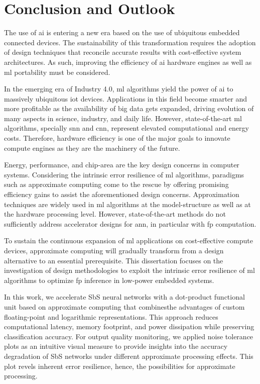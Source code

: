 \chapter{Conclusion and Outlook}
\label{chap.conclusion}
\minitoc
The use of \gls{ai} is entering a new era based on the use of ubiquitous embedded connected devices. The sustainability of this transformation requires the adoption of design techniques that reconcile accurate results with cost-effective system architectures. As such, improving the efficiency of \gls{ai} hardware engines as well as \gls{ml} portability must be considered.

In the emerging era of Industry 4.0, \gls{ml} algorithms yield the power of \gls{ai} to massively ubiquitous \gls{iot} devices. Applications in this field become smarter and more profitable as the availability of big data gets expanded, driving evolution of many aspects in science, industry, and daily life. However, state-of-the-art \gls{ml} algorithms, specially \gls{snn} and \gls{cnn}, represent elevated computational and energy costs. Therefore, hardware efficiency is one of the major goals to innovate compute engines as they are the machinery of the future.

Energy, performance, and chip-area are the key design concerns in computer systems. Considering the intrinsic error resilience of \gls{ml} algorithms, paradigms such as approximate computing come to the rescue by offering promising efficiency gains to assist the aforementioned design concerns. Approximation techniques are widely used in \gls{ml} algorithms at the model-structure as well as at the hardware processing level. However, state-of-the-art methods do not sufficiently address accelerator designs for \gls{ann}, in particular with \gls{fp} computation.

To sustain the continuous expansion of \gls{ml} applications on cost-effective compute devices, approximate computing will gradually transform from a design alternative to an essential prerequisite. This dissertation focuses on the investigation of design methodologies to exploit the intrinsic error resilience of \gls{ml} algorithms to optimize \gls{fp} inference in low-power embedded systems.

In this work, we accelerate SbS neural networks with a dot-product functional unit based on approximate computing that combinesthe advantages of custom floating-point and logarithmic representations. This approach reduces computational latency, memory footprint, and power dissipation while preserving classification accuracy. For output quality monitoring, we applied noise tolerance plots as an intuitive visual measure to provide insights into the accuracy degradation of SbS networks under different approximate processing effects. This plot revels inherent error resilience, hence, the possibilities for approximate processing.


